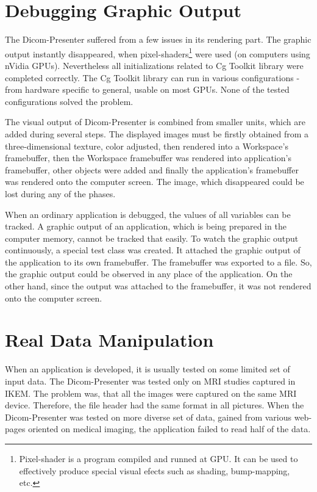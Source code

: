 \section{Debugging Graphic Output}
The Dicom-Presenter suffered from a few issues in its rendering part. The graphic output instantly disappeared, when pixel-shaders\footnote{Pixel-shader is a program compiled and runned at GPU. It can be used to effectively produce special visual efects such as shading, bump-mapping, etc.} were used (on computers using nVidia GPUs). Nevertheless all initializations related to Cg Toolkit library were completed correctly. The Cg Toolkit library can run in various configurations - from hardware specific to general, usable on most GPUs. None of the tested configurations solved the problem.

The visual output of Dicom-Presenter is combined from smaller units, which are added during several steps. The displayed images must be firstly obtained from a three-dimensional texture, color adjusted, then rendered into a Workspace's framebuffer, then the Workspace framebuffer was rendered into application's framebuffer, other objects were added and finally the application's framebuffer was rendered onto the computer screen. The image, which disappeared could be lost during any of the phases.

When an ordinary application is debugged, the values of all variables can be tracked. A graphic output of an application, which is being prepared in the computer memory, cannot be tracked that easily. To watch the graphic output continuously, a special test class was created. It attached the graphic output of the application to its own framebuffer. The framebuffer was exported to a file. So, the graphic output could be observed in any place of the application. On the other hand, since the output was attached to the framebuffer, it was not rendered onto the computer screen.

\section{Real Data Manipulation}
When an application is developed, it is usually tested on some limited set of input data. The Dicom-Presenter was tested only on MRI studies captured in IKEM. The problem was, that all the images were captured on the same MRI device. Therefore, the file header had the same format in all pictures. When the Dicom-Presenter was tested on more diverse set of data, gained from various web-pages oriented on medical imaging, the application failed to read half of the data.

